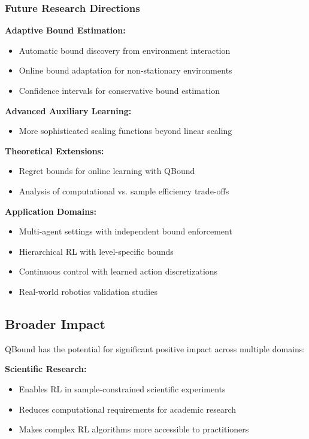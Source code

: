 \documentclass[11pt]{article}
\theoremstyle{definition}
\theoremstyle{remark}
\begin{document}
\subsubsection{Future Research Directions}

\textbf{Adaptive Bound Estimation:}
\begin{itemize}
    \item Automatic bound discovery from environment interaction
    \item Online bound adaptation for non-stationary environments
    \item Confidence intervals for conservative bound estimation
\end{itemize}

\textbf{Advanced Auxiliary Learning:}
\begin{itemize}
    \item More sophisticated scaling functions beyond linear scaling
\end{itemize}

\textbf{Theoretical Extensions:}
\begin{itemize}
    \item Regret bounds for online learning with QBound
    \item Analysis of computational vs. sample efficiency trade-offs
\end{itemize}

\textbf{Application Domains:}
\begin{itemize}
    \item Multi-agent settings with independent bound enforcement
    \item Hierarchical RL with level-specific bounds
    \item Continuous control with learned action discretizations
    \item Real-world robotics validation studies
\end{itemize}

\subsection{Broader Impact}

QBound has the potential for significant positive impact across multiple domains:

\textbf{Scientific Research:}
\begin{itemize}
    \item Enables RL in sample-constrained scientific experiments
    \item Reduces computational requirements for academic research
    \item Makes complex RL algorithms more accessible to practitioners
\end{itemize}
\end{document}
